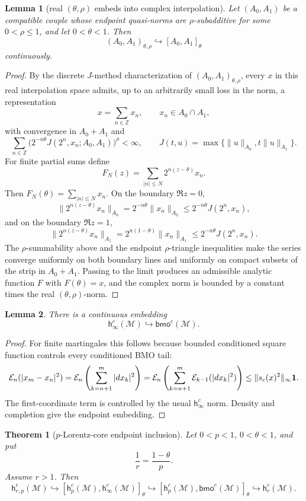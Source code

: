 \documentclass[11pt]{article}
\newcommand{\M}{\mathcal M}
\newcommand{\h}{\mathsf h}
\newcommand{\bmo}{\mathsf{bmo}}
\newcommand{\E}{\mathcal E}
\newtheorem{theorem}{Theorem}
\newtheorem{lemma}{Lemma}
\begin{document}
\begin{lemma}[real \((\theta,\rho)\) embeds into complex interpolation]
Let \((A_0,A_1)\) be a compatible couple whose endpoint quasi-norms are
\(\rho\)-subadditive for some \(0<\rho\le 1\), and let \(0<\theta<1\). Then
\[
(A_0,A_1)_{\theta,\rho}\hookrightarrow [A_0,A_1]_\theta
\]
continuously.
\end{lemma}

\begin{proof}
By the discrete \(J\)-method characterization of
\((A_0,A_1)_{\theta,\rho}\), every
\(x\) in this real interpolation space admits, up to an arbitrarily small
loss in the norm, a representation
\[
x=\sum_{n\in\mathbb Z} x_n,\qquad x_n\in A_0\cap A_1,
\]
with convergence in \(A_0+A_1\) and
\[
\sum_{n\in\mathbb Z} \big(2^{-n\theta}
J(2^n,x_n;A_0,A_1)\big)^\rho<\infty,
\qquad
J(t,u)=\max\{\|u\|_{A_0},t\|u\|_{A_1}\}.
\]
For finite partial sums define
\[
F_N(z)=\sum_{|n|\le N}2^{n(z-\theta)}x_n.
\]
Then \(F_N(\theta)=\sum_{|n|\le N}x_n\). On the boundary \(\Re z=0\),
\[
\|2^{n(z-\theta)}x_n\|_{A_0}
=2^{-n\theta}\|x_n\|_{A_0}
\le 2^{-n\theta}J(2^n,x_n),
\]
and on the boundary \(\Re z=1\),
\[
\|2^{n(z-\theta)}x_n\|_{A_1}
=2^{n(1-\theta)}\|x_n\|_{A_1}
\le 2^{-n\theta}J(2^n,x_n).
\]
The \(\rho\)-summability above and the endpoint \(\rho\)-triangle inequalities
make the series converge uniformly on both boundary lines and uniformly on
compact subsets of the strip in \(A_0+A_1\). Passing to the limit produces an
admissible analytic function \(F\) with \(F(\theta)=x\), and the complex norm
is bounded by a constant times the real \((\theta,\rho)\)-norm.
\end{proof}

\begin{lemma}
There is a continuous embedding
\[
\h_\infty^c(\M)\hookrightarrow \bmo^c(\M).
\]
\end{lemma}

\begin{proof}
For finite martingales this follows because bounded conditioned square
function controls every conditioned BMO tail:
\[
\E_n(|x_m-x_n|^2)
  =\E_n\left(\sum_{k=n+1}^m |dx_k|^2\right)
  =\E_n\left(\sum_{k=n+1}^m \E_{k-1}(|dx_k|^2)\right)
  \le \|s_c(x)^2\|_\infty{\bf 1}.
\]
The first-coordinate term is controlled by the usual \(\h_\infty^c\) norm.
Density and completion give the endpoint embedding.
\end{proof}

\begin{theorem}[\(p\)-Lorentz-core endpoint inclusion]
Let \(0<p<1\), \(0<\theta<1\), and put
\[
\frac1r=\frac{1-\theta}{p}.
\]
Assume \(r>1\). Then
\[
\h_{r,p}^c(\M)
\hookrightarrow
[\h_p^c(\M),\h_\infty^c(\M)]_\theta
\hookrightarrow
[\h_p^c(\M),\bmo^c(\M)]_\theta
\hookrightarrow
\h_r^c(\M).
\]
\end{theorem}
\end{document}
